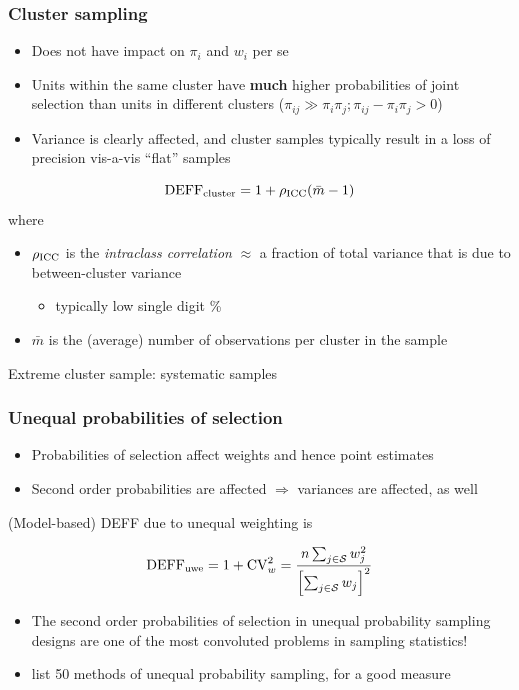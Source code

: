 \documentclass[handout]{beamer}
\begin{document}
\begin{frame}\frametitle{Cluster sampling}

\begin{itemize}
    \item Does not have impact on $\pi_i$ and $w_i$ per se
    \item Units within the same cluster have \textbf{much} higher probabilities of joint selection
        than units in different clusters ($\pi_{ij} \gg \pi_i \pi_j; \pi_{ij} - \pi_i \pi_j > 0$)
    \item Variance is clearly affected, and cluster samples typically result in a loss of precision
        vis-a-vis ``flat'' samples
\end{itemize}

$$
{\rm DEFF}_{\rm cluster} = 1 + \rho_{\rm ICC}(\bar m-1)
$$
where
\begin{itemize}
    \item $\rho_{\rm ICC}$ is the \textit{intraclass correlation} $\approx$
        a fraction of total variance that is due to between-cluster variance
        \begin{itemize} \item typically low single digit \% \end{itemize}
    \item $\bar m$ is the (average) number of observations per cluster in the sample
\end{itemize}

Extreme cluster sample: systematic samples

\end{frame}

\begin{frame}\frametitle{Unequal probabilities of selection}

\begin{itemize}
    \item Probabilities of selection affect weights and hence point estimates
    \item Second order probabilities are affected $\Rightarrow$ variances are affected, as well
\end{itemize}

\medskip

(Model-based) DEFF due to unequal weighting is

$$
{\rm DEFF}_{\rm uwe} = 1 + {\rm CV}_w^2 = \frac{n \sum_{j\in\mathcal{S}} w_j^2}{\Bigl[\sum_{j\in\mathcal{S}} w_j\Bigr]^2}
$$

\medskip

\begin{itemize}
    \item The second order probabilities of selection in unequal probability sampling designs
        are one of the most convoluted problems in sampling statistics!
    \item \citet{brewer:hanif:1983} list 50 methods of unequal probability sampling, for a good measure
\end{itemize}


\end{frame}
\end{document}

